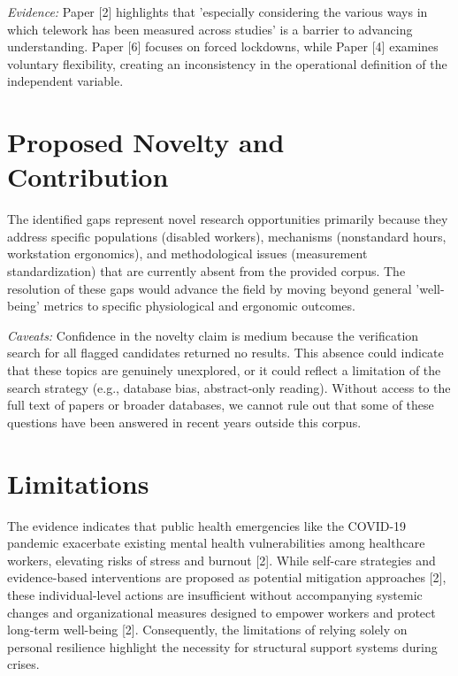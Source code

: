 \documentclass[11pt]{article}
\begin{document}
\textit{Evidence:} Paper [2] highlights that 'especially considering the various ways in which telework has been measured across studies' is a barrier to advancing understanding. Paper [6] focuses on forced lockdowns, while Paper [4] examines voluntary flexibility, creating an inconsistency in the operational definition of the independent variable.

\section{Proposed Novelty and Contribution}
The identified gaps represent novel research opportunities primarily because they address specific populations (disabled workers), mechanisms (nonstandard hours, workstation ergonomics), and methodological issues (measurement standardization) that are currently absent from the provided corpus. The resolution of these gaps would advance the field by moving beyond general 'well-being' metrics to specific physiological and ergonomic outcomes.

\textit{Caveats:} Confidence in the novelty claim is medium because the verification search for all flagged candidates returned no results. This absence could indicate that these topics are genuinely unexplored, or it could reflect a limitation of the search strategy (e.g., database bias, abstract-only reading). Without access to the full text of papers or broader databases, we cannot rule out that some of these questions have been answered in recent years outside this corpus.

\section{Limitations}
The evidence indicates that public health emergencies like the COVID-19 pandemic exacerbate existing mental health vulnerabilities among healthcare workers, elevating risks of stress and burnout [2]. While self-care strategies and evidence-based interventions are proposed as potential mitigation approaches [2], these individual-level actions are insufficient without accompanying systemic changes and organizational measures designed to empower workers and protect long-term well-being [2]. Consequently, the limitations of relying solely on personal resilience highlight the necessity for structural support systems during crises.
\end{document}
